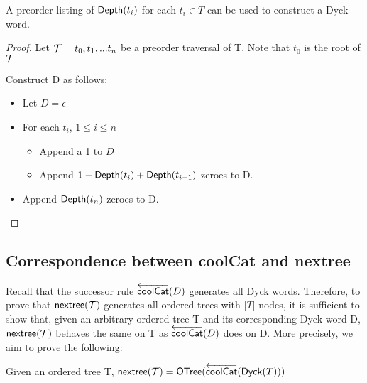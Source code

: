 \begin{remark}A preorder listing of $\mathsf{Depth}{(t_i)} $ for each $ t_i \in T$ can be used to construct a Dyck word. \label{re:construct_dyck}

\end{remark} 
\begin{proof}

    Let $\mathcal{T}=t_0,t_1,...t_n$ be a preorder traversal of T.  Note that $t_0$ is the root of $\mathcal{T}$

    Construct D as follows: 

    \begin{itemize}
	\item Let $D=\epsilon$ %
	\item For each $t_i$, $1\le i \le n$
	    \begin{itemize}
		\item Append a 1 to $D$
		\item Append $1-\mathsf{Depth}{(t_{i})}+\mathsf{Depth}{(t_{i-1})}$ zeroes to D.
	    \end{itemize}
	\item Append $\mathsf{Depth}{(t_{n})}$ zeroes to D. 
    \end{itemize}
\end{proof} 

\subsection{Correspondence between coolCat and nextree}
Recall that the successor rule $\overleftarrow{\mathsf{coolCat}}{(D)}$ generates all Dyck words.  Therefore,  to prove that $\mathsf{nextree}{(\mathcal{T})}$ generates all ordered trees with $|T|$ nodes, it is sufficient to show that, given an arbitrary ordered tree T and its corresponding Dyck word D, $\mathsf{nextree}{(\mathcal{T})}$ behaves the same on T as $\overleftarrow{\mathsf{coolCat}}{(D)}$ does on D. More precisely, we aim to prove the following: 



\begin{theorem}
    Given an ordered tree T, $\mathsf{nextree}{(\mathcal{T})}=\mathsf{OTree}{(\overleftarrow{\mathsf{coolCat}}{(\mathsf{Dyck}{(T)})})}$
\end{theorem}

